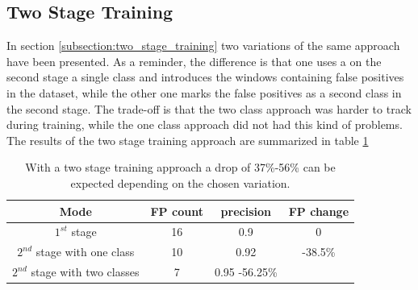 \subsection*{Two Stage Training}
In section \ref{subsection:two_stage_training} two variations of the same approach have been presented. As a reminder, the difference is that one uses a on the second stage a single class and introduces the windows containing false positives in the dataset, while the other one marks the false positives as a second class in the second stage. The trade-off is that the two class approach was harder to track during training, while the one class approach did not had this kind of problems.
The results of the two stage training approach are summarized in table \ref{impl:two_stage_table} \\
\begin{table}
  \centering
    \begin{tabular}{||c|c|c|c||}
    \hline
    Mode & FP count & precision & FP change\\ [0.5ex]
    \hline\hline
    $1^{st}$ stage & 16 & 0.9 &0 \\
    $2^{nd}$ stage with one class & 10 &  0.92 & -38.5\%\\
    $2^{nd}$ stage with two classes & 7 & 0.95 -56.25\%\\
    \hline
    \end{tabular}
  \caption{With a two stage training approach a drop of 37\%-56\% can be expected depending on the chosen variation. }
  \label{impl:two_stage_table}
\end{table}


